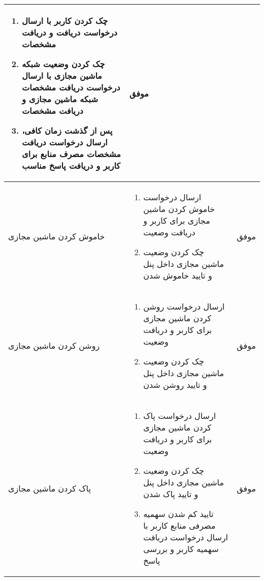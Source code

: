 \begin{center}
\begin{longtable}{ | P{2cm} | P{11cm} | c | }
{\begin{enumerate}[rightmargin=1cm,topsep=0pt,partopsep=0pt]
		\item چک کردن  کاربر با ارسال درخواست دریافت  و دریافت مشخصات
		
		\item چک کردن وضعیت شبکه ماشین مجازی با ارسال درخواست دریافت مشخصات شبکه ماشین مجازی و دریافت مشخصات
		
		\item پس از گذشت زمان کافی، ارسال درخواست دریافت مشخصات مصرف منابع برای کاربر و دریافت پاسخ مناسب
	\end{enumerate}
} &
موفق \\ \hline

 خاموش کردن ماشین مجازی&
{\footnotesize
	\begin{enumerate}[rightmargin=1cm,topsep=0pt,partopsep=0pt]
		\item ارسال درخواست خاموش کردن ماشین مجازی برای کاربر و دریافت وضعیت 
		
		\item چک کردن وضعیت ماشین مجازی داخل پنل  و تایید خاموش شدن
	\end{enumerate}
} &
موفق \\ \hline


روشن کردن ماشین مجازی&
{\footnotesize
	\begin{enumerate}[rightmargin=1cm,topsep=0pt,partopsep=0pt]
		\item ارسال درخواست روشن کردن ماشین مجازی برای کاربر و دریافت وضعیت 
		
		\item چک کردن وضعیت ماشین مجازی داخل پنل  و تایید روشن شدن
	\end{enumerate}
} &
موفق \\ \hline


پاک کردن ماشین مجازی&
{\footnotesize
	\begin{enumerate}[rightmargin=1cm,topsep=0pt,partopsep=0pt]
		\item ارسال درخواست پاک کردن ماشین مجازی برای کاربر و دریافت وضعیت 
		
		\item چک کردن وضعیت ماشین مجازی داخل پنل  و تایید پاک شدن
		
		\item تایید کم شدن سهمیه مصرفی منابع کاربر با ارسال درخواست دریافت سهمیه کاربر و بررسی پاسخ
	\end{enumerate}
} &
موفق \\ \hline
\end{longtable}
\end{center}

